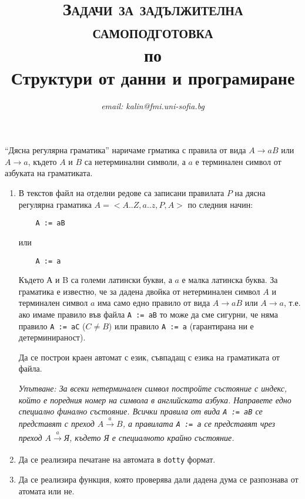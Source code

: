 \documentclass[12pt,a4paper]{article}
\author{\textit{email: kalin@fmi.uni-sofia.bg}}
\title{\textsc{Задачи за задължителна самоподготовка} \\
по \\
Структури от данни и програмиране}
\begin{document}
\maketitle


``Дясна регулярна граматика'' наричаме грматика с правила от вида $A \rightarrow aB$ или $A \rightarrow a$, където $A$ и $B$ са нетерминални символи, а $a$ е терминален символ от азбуката на граматиката.



\begin{enumerate}


	\item В текстов файл на отделни редове са записани правилата $P$ на дясна регулярна граматика $A=<A..Z,a..z,P,A>$ по следния начин:
	\begin{verbatim}
	A := aB
	\end{verbatim}

	или

	\begin{verbatim}
	A := a
	\end{verbatim}

	Където А и B са големи латински букви, а $a$ е малка латинска буква. За граматика е известно, че за дадена двойка от нетерминален символ $A$ и терминален символ $a$ има само едно правило от вида $A \rightarrow aB$ или $A \rightarrow a$, т.е. ако имаме правило във файла \texttt{A := aB} то може да сме сигурни, че няма правило \texttt{A := aC} ($C \neq B$) или правило \texttt{A := a} (гарантирана ни е детерминираност).

	Да се построи краен автомат с език, съвпадащ с езика на граматиката от файла.

	\emph{Упътване: За всеки нетерминален символ постройте състояние с индекс, който е поредния номер на символа в английската азбука. Направете едно специално финално състояние. Всички правила от вида \texttt{A := aB} се представят с преход $A \xrightarrow[]{a}B$, а правилата \texttt{A := a} се представят чрез преход $A \xrightarrow[]{a}$Я, където Я е специалното крайно състояние.}

	\item Да се реализира печатане на автомата в \texttt{dotty} формат.

	\item Да се реализира функция, която проверява дали дадена дума се разпознава от атомата или не.


\end{enumerate}
\end{document}

